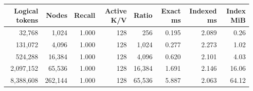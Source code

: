 \begin{tabular}{rrrrrrrr}
\toprule
Logical tokens & Nodes & Recall & Active K/V & Ratio & Exact ms & Indexed ms & Index MiB \\
\midrule
32,768 & 1,024 & 1.000 & 128 & 256 & 0.195 & 2.089 & 0.26 \\
131,072 & 4,096 & 1.000 & 128 & 1,024 & 0.277 & 2.273 & 1.02 \\
524,288 & 16,384 & 1.000 & 128 & 4,096 & 0.620 & 2.101 & 4.03 \\
2,097,152 & 65,536 & 1.000 & 128 & 16,384 & 1.691 & 2.146 & 16.06 \\
8,388,608 & 262,144 & 1.000 & 128 & 65,536 & 5.887 & 2.063 & 64.12 \\
\bottomrule
\end{tabular}
